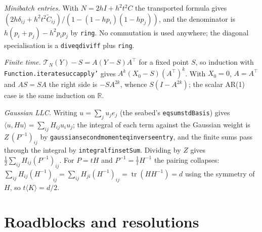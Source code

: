 \documentclass[11pt]{article}
\newcommand{\R}{\mathbb{R}}
\newcommand{\tr}{\operatorname{tr}}
\newcommand{\code}[1]{{\def\_{\textunderscore\allowbreak}\texttt{#1}}}
\begin{document}
\emph{Minibatch entries.} With $N = 2hI + h^2t^2C$ the transported
formula gives $(2h\delta_{ij} + h^2t^2\tilde C_{ij})/(1 - (1 - hp_i)(1 -
hp_j))$, and the denominator is $h(p_i + p_j) - h^2p_ip_j$ by \code{ring}.
No commutation is used anywhere; the diagonal specialisation is a
\code{div\_eq\_div\_iff} plus \code{ring}.

\emph{Finite time.} $\mathcal T_N(Y) - S = A(Y - S)A^\top$ for a fixed
point $S$, so induction with \code{Function.iterate\_succ\_apply'} gives
$A^k(X_0 - S)(A^\top)^k$. With $X_0 = 0$, $A = A^\top$ and $AS = SA$ the
right side is $-S A^{2k}$, whence $S(I - A^{2k})$; the scalar AR(1) case
is the same induction on $\R$.

\emph{Gaussian LLC.} Writing $u = \sum_j u_j e_j$ (the seabed's
\code{eq\_sum\_stdBasis}) gives $\langle u, Hu\rangle = \sum_{ij}H_{ij}
u_iu_j$; the integral of each term against the Gaussian weight is
$Z\,(P^{-1})_{ij}$ by \code{gaussian\_second\_moment\_eq\_inverse\_entry},
and the finite sums pass through the integral by
\code{integral\_finsetSum}. Dividing by $Z$ gives $\tfrac12\sum_{ij}
H_{ij}(P^{-1})_{ij}$. For $P = tH$ and $P^{-1} = \tfrac1t H^{-1}$ the
pairing collapses: $\sum_{ij}H_{ij}(H^{-1})_{ij} = \sum_{ij}H_{ji}
(H^{-1})_{ij} = \tr(HH^{-1}) = d$ using the symmetry of $H$, so
$t\langle K\rangle = d/2$.

\section{Roadblocks and resolutions}
\end{document}
